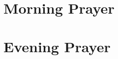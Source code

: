 \documentclass{lbi_cantor_letter}
\begin{document}

\section{Morning Prayer}


\section{Evening Prayer}

\end{document}

